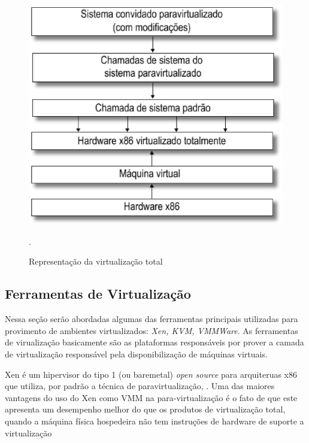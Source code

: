 \begin{figure}[!htb]
\centering
\includegraphics [keepaspectratio=true,scale=0.3]{figuras/paravirtualization.eps}
\caption{Representação da virtualização total}
\cite{marcos}.
\label{paravirtualization}
\end{figure}

\subsection{Ferramentas de Virtualização}
Nessa seção serão abordadas algumas das ferramentas principais utilizadas para provimento de ambientes virtualizados: \textit{Xen, KVM, VMMWare}. As ferramentas de virualização basicamente são as plataformas responsáveis por prover a camada de virtualização responsável pela disponibilização de máquinas virtuais.

Xen é um hipervisor do tipo 1 (ou baremetal) \textit{open source} para arquiteruas x86 que utiliza, por padrão a técnica de paravirtualização, \cite{clark}. Uma das maiores vantagens do uso do Xen como VMM na para-virtualização é o fato de que este apresenta um desempenho melhor do que os produtos de virtualização total, quando a máquina física hospedeira não tem instruções de hardware de suporte a virtualização \cite{eder}  

